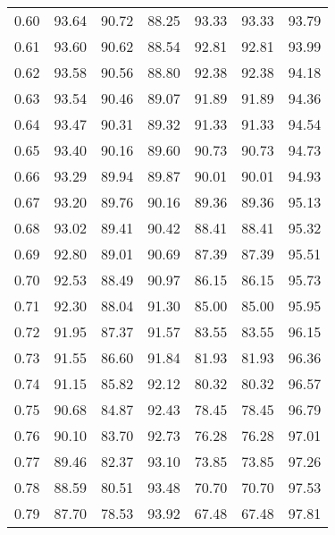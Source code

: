 \begin{tabular}{|c|c|c|c|c|c|c|}
      0.60 &     93.64 &     90.72 &      88.25 &   93.33 &      93.33 &         93.79 \\
      0.61 &     93.60 &     90.62 &      88.54 &   92.81 &      92.81 &         93.99 \\
      0.62 &     93.58 &     90.56 &      88.80 &   92.38 &      92.38 &         94.18 \\
      0.63 &     93.54 &     90.46 &      89.07 &   91.89 &      91.89 &         94.36 \\
      0.64 &     93.47 &     90.31 &      89.32 &   91.33 &      91.33 &         94.54 \\
      0.65 &     93.40 &     90.16 &      89.60 &   90.73 &      90.73 &         94.73 \\
      0.66 &     93.29 &     89.94 &      89.87 &   90.01 &      90.01 &         94.93 \\
      0.67 &     93.20 &     89.76 &      90.16 &   89.36 &      89.36 &         95.13 \\
      0.68 &     93.02 &     89.41 &      90.42 &   88.41 &      88.41 &         95.32 \\
      0.69 &     92.80 &     89.01 &      90.69 &   87.39 &      87.39 &         95.51 \\
      0.70 &     92.53 &     88.49 &      90.97 &   86.15 &      86.15 &         95.73 \\
      0.71 &     92.30 &     88.04 &      91.30 &   85.00 &      85.00 &         95.95 \\
      0.72 &     91.95 &     87.37 &      91.57 &   83.55 &      83.55 &         96.15 \\
      0.73 &     91.55 &     86.60 &      91.84 &   81.93 &      81.93 &         96.36 \\
      0.74 &     91.15 &     85.82 &      92.12 &   80.32 &      80.32 &         96.57 \\
      0.75 &     90.68 &     84.87 &      92.43 &   78.45 &      78.45 &         96.79 \\
      0.76 &     90.10 &     83.70 &      92.73 &   76.28 &      76.28 &         97.01 \\
      0.77 &     89.46 &     82.37 &      93.10 &   73.85 &      73.85 &         97.26 \\
      0.78 &     88.59 &     80.51 &      93.48 &   70.70 &      70.70 &         97.53 \\
      0.79 &     87.70 &     78.53 &      93.92 &   67.48 &      67.48 &         97.81 \\

\end{tabular}
